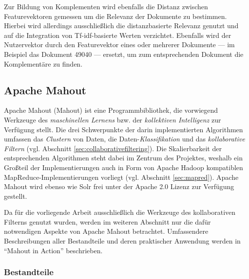

Zur Bildung von Komplementen wird ebenfalls die Distanz zwischen Featurevektoren gemessen um die Relevanz der Dokumente zu bestimmen. Hierbei wird allerdings ausschließlich die distanzbasierte Relevanz genutzt und auf die Integration von Tf-idf-basierte Werten verzichtet. Ebenfalls wird der Nutzervektor durch den Featurevektor eines oder mehrerer Dokumente --- im Beispiel das Dokument 49040 --- ersetzt, um zum entsprechenden Dokument die Komplementäre zu finden.



\subsection{Apache Mahout} \label{sec:mahout}

Apache Mahout (Mahout) ist eine Programmbibliothek, die vorwiegend Werkzeuge des \textit{maschinellen Lernens} bzw. der \textit{kollektiven Intelligenz} zur Verfügung stellt. Die drei Schwerpunkte der darin implementierten Algorithmen umfassen das \textit{Clustern} von Daten, die Daten-\textit{Klassifikation} und das \textit{kollaborative Filtern} (vgl. Abschnitt \ref{sec:collaborativefiltering}). Die Skalierbarkeit der entsprechenden Algorithmen steht dabei im Zentrum des Projektes, weshalb ein Großteil der Implementierungen auch in Form von Apache Hadoop kompatiblen MapReduce-Implementierungen vorliegt (vgl. Abschnitt \ref{sec:mapred}). Apache Mahout wird ebenso wie Solr frei unter der Apache 2.0 Lizenz zur Verfügung gestellt. \citep{mia}

Da für die vorliegende Arbeit ausschließlich die Werkzeuge des kollaborativen Filterns genutzt wurden, werden im weiteren Abschnitt nur die dafür notwendigen Aspekte von Apache Mahout betrachtet. Umfassendere Beschreibungen aller Bestandteile und deren praktischer Anwendung werden in ``Mahout in Action'' \citep{mia} beschrieben. 

\subsubsection{Bestandteile} \label{sec:mahoutparts}

